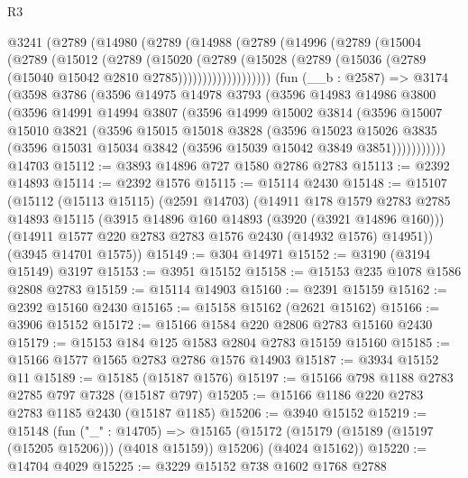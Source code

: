 \begin{lexlean}{R3}
\begin{coremodule}
    @3241
      (@2789
        (@14980
          (@2789
            (@14988
              (@2789
                (@14996
                  (@2789
                    (@15004
                      (@2789
                        (@15012
                          (@2789
                            (@15020
                              (@2789
                                (@15028
                                  (@2789
                                    (@15036 (@2789 (@15040 @15042 @2810 @2785)))))))))))))))))))
    (fun (__b : @2587) =>
    @3174
      (@3598
        @3786
        (@3596
          @14975
          @14978
          @3793
          (@3596
            @14983
            @14986
            @3800
            (@3596
              @14991
              @14994
              @3807
              (@3596
                @14999
                @15002
                @3814
                (@3596
                  @15007
                  @15010
                  @3821
                  (@3596
                    @15015
                    @15018
                    @3828
                    (@3596
                      @15023
                      @15026
                      @3835
                      (@3596 @15031 @15034 @3842 (@3596 @15039 @15042 @3849 @3851)))))))))))
    @14703
@15112 := @3893 @14896 @727 @1580 @2786 @2783
@15113 := @2392 @14893
@15114 := @2392 @1576
@15115 := @15114 @2430
@15148 := @15107
    (@15112
      (@15113 @15115)
      (@2591 @14703)
      (@14911
        @178
        @1579
        @2783
        @2785
        @14893
        @15115
        (@3915 @14896 @160 @14893 (@3920 (@3921 @14896 @160)))
        (@14911 @1577 @220 @2783 @2783 @1576 @2430 (@14932 @1576) @14951))
      (@3945 @14701 @1575))
@15149 := @304 @14971
@15152 := @3190 (@3194 @15149) @3197
@15153 := @3951 @15152
@15158 := @15153 @235 @1078 @1586 @2808 @2783
@15159 := @15114 @14903
@15160 := @2391 @15159
@15162 := @2392 @15160 @2430
@15165 := @15158 @15162 (@2621 @15162)
@15166 := @3906 @15152
@15172 := @15166 @1584 @220 @2806 @2783 @15160 @2430
@15179 := @15153 @184 @125 @1583 @2804 @2783 @15159 @15160
@15185 := @15166 @1577 @1565 @2783 @2786 @1576 @14903
@15187 := @3934 @15152 @11
@15189 := @15185 (@15187 @1576)
@15197 := @15166 @798 @1188 @2783 @2785 @797 @7328 (@15187 @797)
@15205 := @15166 @1186 @220 @2783 @2783 @1185 @2430 (@15187 @1185)
@15206 := @3940 @15152
@15219 := @15148
    (fun ("_" : @14705) =>
    @15165 (@15172 (@15179 (@15189 (@15197 (@15205 @15206))) (@4018 @15159)) @15206) (@4024 @15162))
@15220 := @14704 @4029
@15225 := @3229 @15152 @738 @1602 @1768 @2788

\end{coremodule}
\end{lexlean}
